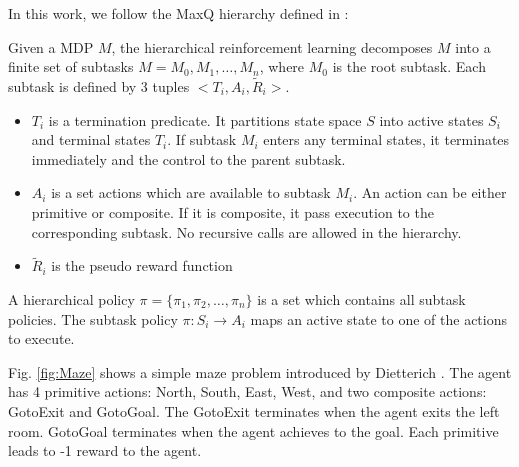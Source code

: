In this work, we follow the MaxQ hierarchy defined in \cite{MaxQ}:
\begin{definition}
    Given a MDP $M$, the hierarchical reinforcement learning decomposes $M$ into a finite
    set of subtasks $M = {M_0, M_1, \dots, M_n}$, where $M_0$ is the root subtask. 
    Each subtask is defined by 3 tuples $<T_i, A_i, \tilde{R}_i>$. 
    \begin{itemize}{}
    \item $T_i$ is a termination predicate. It partitions state space $S$ into active states $S_i$ and
                terminal states $T_i$. If subtask $M_i$ enters any terminal states, it terminates immediately
                and the control to the parent subtask. 
    \item $A_i$ is a set actions which are available to subtask $M_i$. An action can be either primitive or composite.
                If it is composite, it pass execution to the corresponding subtask. No recursive calls 
                are allowed in the hierarchy.
    \item $\tilde{R}_i$ is the pseudo reward function 
    \end{itemize}
\end{definition}
A hierarchical policy $\pi = \{\pi_1, \pi_2, \dots, \pi_n\}$ is a set which contains all subtask policies. 
The subtask policy $\pi: S_i \rightarrow A_i$ maps an active state to one of the actions to execute.

Fig. \ref{fig:Maze} shows a simple maze problem introduced by Dietterich \cite{MaxQJ}.
The agent has 4 primitive actions: North, South, East, West, and two composite actions: GotoExit and GotoGoal.
The 
GotoExit terminates when the agent exits the left room. GotoGoal terminates when the agent achieves to the goal.
Each primitive leads to -1 reward to the agent.

